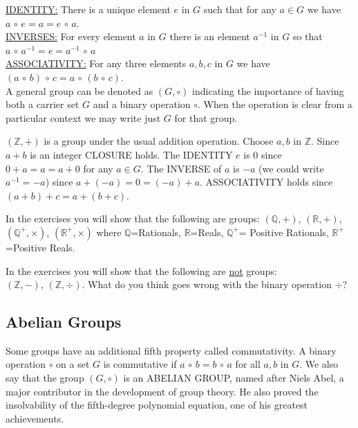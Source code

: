\documentclass[12pt]{book}
\theoremstyle{definition}
\def\Z{\mathbb{Z}}
\begin{document}
\underline{IDENTITY:} There is a unique element $e$ in $G$ such that for any $a\in G$ we have $a\,\circ\,e=a=e\,\circ\,a$.\\

\underline{INVERSES:} For every element $a$ in $G$ there is an element $a^{-1}$ in $G$ so that $a\,\circ\,a^{-1}=e=a^{-1}\,\circ\,a$\\

\underline{ASSOCIATIVITY:} For any three elements $a, b, c$ in $G$ we have $(a\,\circ\,b)\,\circ\,c=a\,\circ\,(b\,\circ\,c).$\\
A general group can be denoted as $(G,\circ)$ indicating the importance of having both a carrier set $G$ and a binary operation $\circ$.  When the operation is clear from a particular context we may write just $G$ for that group.
\begin{tcexample}{}{}
 $(\Z,+)$ is a group under the usual addition operation.  Choose $a,b$ in $\Z$.  Since $a+b$ is an integer CLOSURE holds.  The IDENTITY $e$ is 0 since $0+a=a=a+0$ for any $a\in G$.  The INVERSE of $a$ is $-a$ (we could write $a^{-1}=-a$) since $a+(-a)=0=(-a)+a$.  ASSOCIATIVITY holds since $(a+b)+c = a+(b+c)$.
\end{tcexample}

\begin{tcexample}{}{}
 In the exercises you will show that the following are groups: $(\mathbb{Q},+)$, $(\mathbb{R},+)$, $(\mathbb{Q}^+,\times)$, $(\mathbb{R}^+,\times)$ where $\mathbb{Q}$=Rationals, $\mathbb{R}$=Reals, $\mathbb{Q}^+$= Positive Rationals, $\mathbb{R}^+$=Positive Reals.
\end{tcexample}

\begin{tcexample}{}{}
In the exercises you will show that the following are \underline{not} groups: $(\Z,-),\,(\Z,\div)$. What do you think goes wrong with the binary operation $ \div $?
\end{tcexample}

\subsection{Abelian Groups}
\rule{0in}{.5in}
Some groups have an additional fifth property called commutativity.  A binary operation $\circ$ on a set $G$ is commutative if $a\,\circ\,b = b\,\circ\,a$ for all $a,b$ in $G$.  We also say that the group $(G,\circ)$ is an ABELIAN GROUP, named after Niels Abel, a major contributor in the development of group theory.  He also proved the insolvability of the fifth-degree polynomial equation, one of his greatest achievements.\\
\end{document}
